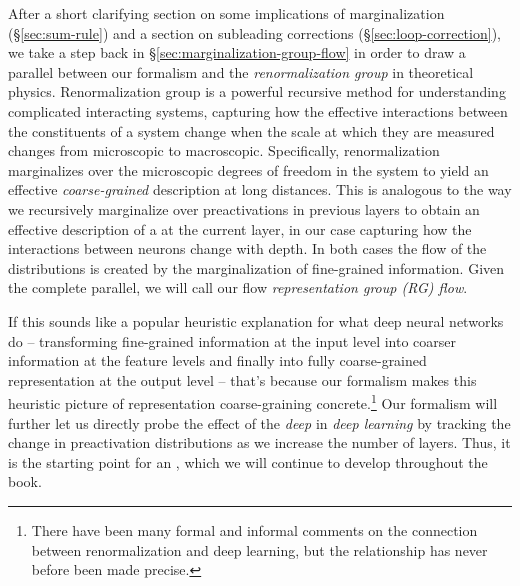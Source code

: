 After a short clarifying section on some implications of marginalization (\S\ref{sec:sum-rule}) and a section on subleading corrections (\S\ref{sec:loop-correction}),
we take a step back in \S\ref{sec:marginalization-group-flow}  in order to
draw a parallel between our formalism and 
 the \emph{renormalization group} in theoretical physics. 
Renormalization group is a powerful recursive method for understanding complicated interacting systems, capturing how the effective interactions between the constituents of a system change when the scale at which they are measured changes from microscopic to macroscopic.
Specifically, renormalization marginalizes over the microscopic degrees of freedom in the system to yield an effective \emph{coarse-grained} description at long distances.
This is analogous to the way we recursively marginalize over preactivations in previous layers to obtain an effective description of a  at the current layer,
in our case capturing how the interactions between neurons change with depth.
In both cases the flow of the distributions is created by the marginalization of fine-grained information. Given the complete parallel, we will call our flow \emph{representation group (RG) flow}.



If this sounds like a popular heuristic explanation for what deep neural networks do -- transforming fine-grained information at the input level into coarser information at the feature levels and finally into fully coarse-grained representation at the output level
-- that's because our formalism makes this heuristic picture of representation coarse-graining concrete.\footnote{There have been many formal and informal comments on the connection between renormalization and deep learning, but the relationship has never before been made precise.}
Our formalism will further let us directly probe the effect of the \emph{deep} in \emph{deep learning} by tracking the change in preactivation distributions as we increase the number of layers.
Thus, it is the starting point for an , which we will continue to develop throughout the book.













































